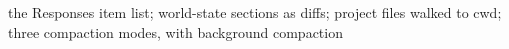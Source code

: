 the Responses item list; world-state sections as diffs; project files walked to cwd; three compaction modes, with background compaction
